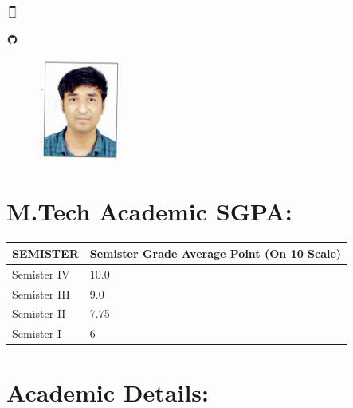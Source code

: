 \documentclass[a4paper,10pt]{article}
\begin{document}
\par
\includegraphics[width=0.03\textwidth,left]{mobile}
\par
\includegraphics[width=0.03\textwidth,left]{GitHub-Mark}
\par	

\vspace{-58mm}

    \begin{figure}[h]
\raggedleft

    \includegraphics[width=0.25\textwidth,right]{CCI09172017}    \end{figure}
    \FloatBarrier






\section{M.Tech Academic SGPA:}

\begin{tabu} to 0.8\textwidth { | X[0.7] | X[3] |  }
 \hline
 
 \Large
 SEMISTER  & \Large
  Semister Grade Average Point (On 10 Scale)   \\
\hline
\large Semister IV & 10.0   \\  
\hline
\large Semister III & 9.0   \\
 \hline
 \large Semister II & 7.75  \\
 \hline
\large Semister I & 6  \\
 \hline
\end{tabu}



\vspace{1mm}


\section{Academic Details:}
\end{document}
